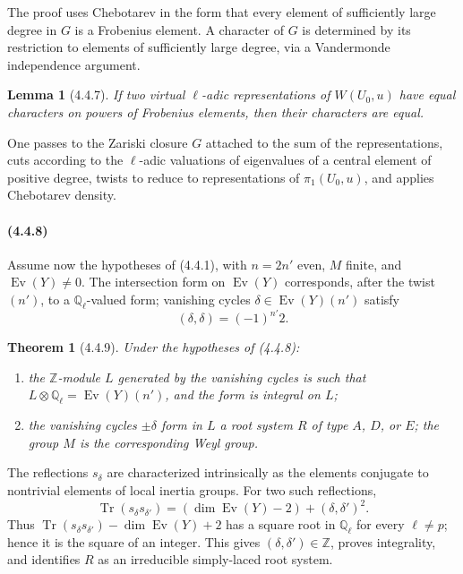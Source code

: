 \documentclass[11pt]{article}
\newtheorem{theorem}{Theorem}
\newtheorem{lemma}{Lemma}
\theoremstyle{remark}
\begin{document}
The proof uses Chebotarev in the form that every element of sufficiently large degree in $G$ is a Frobenius element. A character of $G$ is determined by its restriction to elements of sufficiently large degree, via a Vandermonde independence argument.

\begin{lemma}[4.4.7]
If two virtual $\ell$-adic representations of $W(U_0,u)$ have equal characters on powers of Frobenius elements, then their characters are equal.
\end{lemma}

One passes to the Zariski closure $G$ attached to the sum of the representations, cuts according to the $\ell$-adic valuations of eigenvalues of a central element of positive degree, twists to reduce to representations of $\pi_1(U_0,u)$, and applies Chebotarev density.

\paragraph{(4.4.8)}
Assume now the hypotheses of (4.4.1), with $n=2n'$ even, $M$ finite, and $\operatorname{Ev}(Y)\ne0$. The intersection form on $\operatorname{Ev}(Y)$ corresponds, after the twist $(n')$, to a $\mathbb Q_\ell$-valued form; vanishing cycles $\delta\in\operatorname{Ev}(Y)(n')$ satisfy
\[
(\delta,\delta)=(-1)^{n'}2.
\]

\begin{theorem}[4.4.9]
Under the hypotheses of (4.4.8):
\begin{enumerate}[label=(\alph*)]
\item the $\mathbb Z$-module $L$ generated by the vanishing cycles is such that $L\otimes\mathbb Q_\ell=\operatorname{Ev}(Y)(n')$, and the form is integral on $L$;
\item the vanishing cycles $\pm\delta$ form in $L$ a root system $R$ of type $A$, $D$, or $E$; the group $M$ is the corresponding Weyl group.
\end{enumerate}
\end{theorem}

The reflections $s_\delta$ are characterized intrinsically as the elements conjugate to nontrivial elements of local inertia groups. For two such reflections,
\[
\operatorname{Tr}(s_\delta s_{\delta'})=(\dim\operatorname{Ev}(Y)-2)+(\delta,\delta')^2.
\]
Thus $\operatorname{Tr}(s_\delta s_{\delta'})-\dim\operatorname{Ev}(Y)+2$ has a square root in $\mathbb Q_\ell$ for every $\ell\ne p$; hence it is the square of an integer. This gives $(\delta,
\delta')\in\mathbb Z$, proves integrality, and identifies $R$ as an irreducible simply-laced root system.
\end{document}
